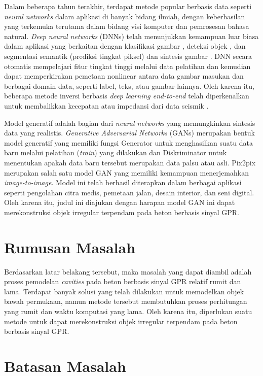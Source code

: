 Dalam beberapa tahun terakhir, terdapat metode popular berbasis data seperti \emph{neural networks} dalam aplikasi di banyak bidang ilmiah, dengan keberhasilan yang terkemuka terutama dalam bidang visi komputer dan pemrosesan bahasa natural. 
\emph{Deep neural networks} (DNNs) telah menunjukkan kemampuan luar biasa dalam aplikasi yang berkaitan dengan klasifikasi gambar \parencite{objectDetection}, deteksi objek \parencite{fasterRCNN}, dan segmentasi semantik (prediksi tingkat piksel) \parencite{difNet} dan sintesis gambar \parencite{GAN}. 
DNN secara otomatis mempelajari fitur tingkat tinggi melalui data pelatihan dan kemudian dapat memperkirakan pemetaan nonlinear antara data gambar masukan dan berbagai domain data, seperti label, teks, atau gambar lainnya. 
Oleh karena itu, beberapa metode inversi berbasis \emph{deep learning end-to-end} telah diperkenalkan untuk membalikkan kecepatan atau impedansi dari data seismik \parencite{gprInvNet}.

Model generatif adalah bagian dari \emph{neural networks} yang memungkinkan sintesis data yang realistis. 
\emph{Generative Adversarial Networks} (GANs) merupakan bentuk model generatif yang memiliki fungsi Generator untuk menghasilkan suatu data baru melalui pelatihan (\emph{train}) yang dilakukan dan Diskriminator untuk menentukan apakah data baru tersebut merupakan data palsu atau asli. 
Pix2pix merupakan salah satu model GAN yang memiliki kemampuan menerjemahkan \emph{image-to-image}. 
Model ini telah berhasil diterapkan dalam berbagai aplikasi seperti pengolahan citra medis, pemetaan jalan, desain interior, dan seni digital. 
Oleh karena itu, judul ini diajukan dengan harapan model GAN ini dapat merekonstruksi objek irregular terpendam pada beton berbasis sinyal GPR.

\section{Rumusan Masalah}
\label{sec:rumusanmasalah}

Berdasarkan latar belakang tersebut, maka masalah yang dapat diambil adalah proses pemodelan \emph{cavities} pada beton berbasis sinyal GPR relatif rumit dan lama. 
Terdapat banyak solusi yang telah dilakukan untuk memodelkan objek bawah permukaan, namun metode tersebut membutuhkan proses perhitungan yang rumit dan waktu komputasi yang lama. 
Oleh karena itu, diperlukan suatu metode untuk dapat merekonstruksi objek irregular terpendam pada beton berbasis sinyal GPR.

\section{Batasan Masalah}
\label{sec:batasanmasalah}

